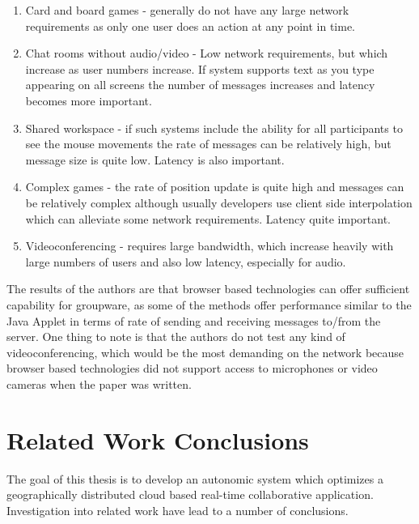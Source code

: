 \begin{enumerate}
	\item Card and board games - generally do not have any large network requirements as only one user does an action at any point in time.
	\item Chat rooms without audio/video - Low network requirements, but which increase as user numbers increase. If system supports text as you type appearing on all screens the number of messages increases and latency becomes more important.
	\item Shared workspace - if such systems include the ability for all participants to see the mouse movements the rate of messages can be relatively high, but message size is quite low. Latency is also important.
	\item Complex games - the rate of position update is quite high and messages can be relatively complex although usually developers use client side interpolation which can alleviate some network requirements. Latency quite important.
	\item Videoconferencing - requires large bandwidth, which increase heavily with large numbers of users and also low latency, especially for audio.
\end{enumerate}

The results of the authors are that browser based technologies can offer sufficient capability for groupware, as some of the methods offer performance similar to the Java Applet in terms of rate of sending and receiving messages to/from the server. One thing to note is that the authors do not test any kind of videoconferencing, which would be the most demanding on the network because browser based technologies did not support access to microphones or video cameras when the paper was written.

\section{Related Work Conclusions}

The goal of this thesis is to develop an autonomic system which optimizes a geographically distributed cloud based real-time collaborative application. Investigation into related work have lead to a number of conclusions. 

